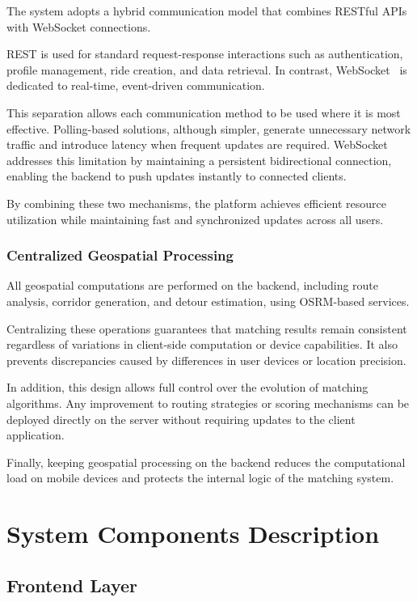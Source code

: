 The system adopts a hybrid communication model that combines RESTful APIs with WebSocket connections.

REST is used for standard request-response interactions such as authentication, profile management, ride creation, and data retrieval. In contrast, WebSocket~\cite{websocket} is dedicated to real-time, event-driven communication.

This separation allows each communication method to be used where it is most effective. Polling-based solutions, although simpler, generate unnecessary network traffic and introduce latency when frequent updates are required. WebSocket addresses this limitation by maintaining a persistent bidirectional connection, enabling the backend to push updates instantly to connected clients.

By combining these two mechanisms, the platform achieves efficient resource utilization while maintaining fast and synchronized updates across all users.

\subsubsection{Centralized Geospatial Processing}

All geospatial computations are performed on the backend, including route analysis, corridor generation, and detour estimation, using OSRM-based services.

Centralizing these operations guarantees that matching results remain consistent regardless of variations in client-side computation or device capabilities. It also prevents discrepancies caused by differences in user devices or location precision.

In addition, this design allows full control over the evolution of matching algorithms. Any improvement to routing strategies or scoring mechanisms can be deployed directly on the server without requiring updates to the client application.

Finally, keeping geospatial processing on the backend reduces the computational load on mobile devices and protects the internal logic of the matching system.

\section{System Components Description}

\subsection{Frontend Layer}

